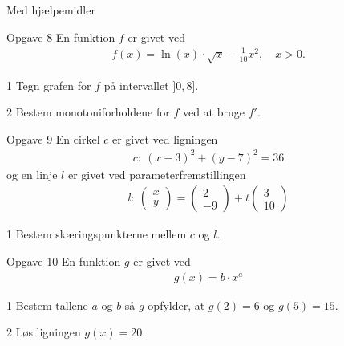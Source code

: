 \begin{center}
	\LARGE
	Med hjælpemidler
\end{center}
\begin{opgavetekst}{Opgave 8}
	En funktion $f$ er givet ved
	\begin{align*}
		f(x) = \ln(x)\cdot \sqrt{x} - \frac{1}{10}x^2, \quad x > 0.
	\end{align*}
\end{opgavetekst}
\begin{delopgave}{1}
	Tegn grafen for $f$ på intervallet $]0,8]$.
\end{delopgave}	
\begin{delopgave}{2}
	Bestem monotoniforholdene for $f$ ved at bruge $f'$. 
\end{delopgave}
%
%
%
%
%
\begin{opgavetekst}{Opgave 9}
	En cirkel $c$ er givet ved ligningen 
	\begin{align*}
		c: \ (x-3)^2 + (y-7)^2 = 36
	\end{align*}
	og en linje $l$ er givet ved parameterfremstillingen
	\begin{align*}
		l: \
		\begin{pmatrix}
			x \\ y
		\end{pmatrix} =
		\begin{pmatrix}
			2 \\ -9
		\end{pmatrix} + 
		t
		\begin{pmatrix}
			3 \\ 10
		\end{pmatrix}
	\end{align*}
\end{opgavetekst}
\begin{delopgave}{1}
	Bestem skæringspunkterne mellem $c$ og $l$.
\end{delopgave}
%
%
%
%
%
%
\begin{opgavetekst}{Opgave 10}
	En funktion $g$ er givet ved
	\begin{align*}
		g(x) = b\cdot x^a
	\end{align*}
\end{opgavetekst}
\begin{delopgave}{1}
	Bestem tallene $a$ og $b$ så $g$ opfylder, at $g(2) = 6$ og $g(5) = 15$.
\end{delopgave}
\begin{delopgave}{2}
	Løs ligningen $g(x) = 20$.
\end{delopgave}
%
%
%
%
%
\newpage
